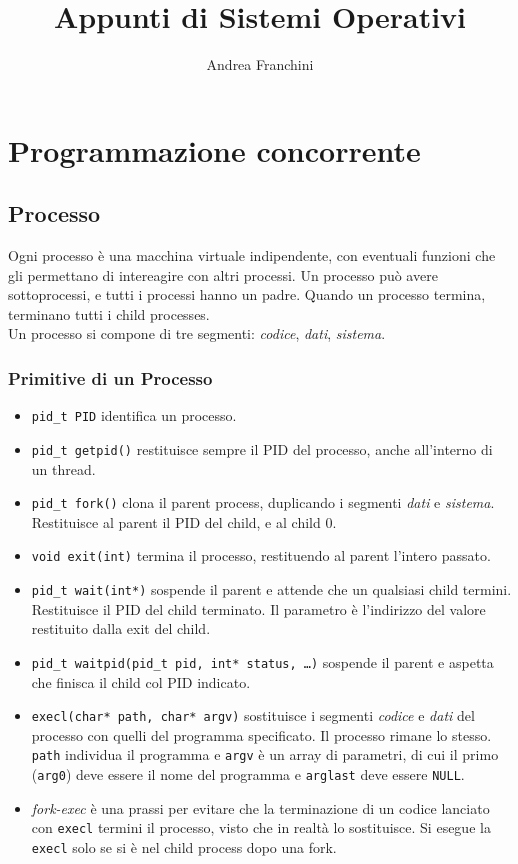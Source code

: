 \documentclass[10pt,a4paper]{article}
\author{Andrea Franchini}
\title{Appunti di Sistemi Operativi}
\newcommand{\code}{\texttt}
\begin{document}
    \maketitle
    \section{Programmazione concorrente}
    \subsection{Processo} Ogni processo è una macchina virtuale indipendente, con eventuali funzioni che gli permettano di intereagire con altri processi. Un processo può avere sottoprocessi, e tutti i processi hanno un padre. Quando un processo termina, terminano tutti i child processes.\\
    Un processo si compone di tre segmenti: \emph{codice}, \emph{dati}, \emph{sistema}.
    \subsubsection{Primitive di un Processo}
    \begin{itemize}
        \item \code{pid\_t PID} identifica un processo.
        \item \code{pid\_t getpid()} restituisce sempre il PID del processo, anche all'interno di un thread.
        \item \code{pid\_t fork()} clona il parent process, duplicando i segmenti \emph{dati} e \emph{sistema}. Restituisce al parent il PID del child, e al child 0.
        \item \code{void exit(int)} termina il processo, restituendo al parent l'intero passato.
        \item \code{pid\_t wait(int*)} sospende il parent e attende che un qualsiasi child termini. Restituisce il PID del child terminato. Il parametro è l'indirizzo del valore restituito dalla exit del child.
        \item \code{pid\_t waitpid(pid\_t pid, int* status, \dots)} sospende il parent e aspetta che finisca il child col PID indicato.
        \item \code{execl(char* path, char* argv)} sostituisce i segmenti \emph{codice} e \emph{dati} del processo con quelli del programma specificato. Il processo rimane lo stesso. \code{path} individua il programma e \code{argv} è un array di parametri, di cui il primo (\code{arg0}) deve essere il nome del programma e \code{arglast} deve essere \code{NULL}.
        \item \emph{fork-exec} è una prassi per evitare che la terminazione di un codice lanciato con \code{execl} termini il processo, visto che in realtà lo sostituisce. Si esegue la \code{execl} solo se si è nel child process dopo una fork.
    \end{itemize}
\end{document}
